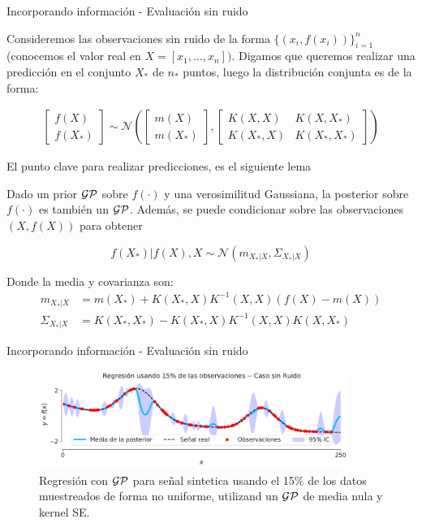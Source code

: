 \documentclass[handout, 9pt]{beamer}
\begin{document}
\begin{frame}{Incorporando información - Evaluación sin ruido}

Consideremos las observaciones sin ruido de la forma $\{(x_i, f(x_i))\}_{i=1}^{n}$ (conocemos el valor real en $X = [x_1 , \dots , x_n])$. Digamos que queremos realizar una predicción en el conjunto $X_*$ de $n_*$ puntos, luego la distribución conjunta es de la forma: \pause 

\begin{align*}
  \begin{bmatrix} f(X) \\ f(X_*)  \end{bmatrix}
  \sim \mathcal{N} \left(
  \begin{bmatrix} m(X) \\ m(X_*)  \end{bmatrix}, 
  \begin{bmatrix}
    K(X, X) & K(X, X_*) \\ K(X_*, X) & K(X_*, X_*)
  \end{bmatrix}
   \right)
\end{align*} \pause 

El punto clave para realizar predicciones, es el siguiente lema \pause 

\begin{lemma}
  Dado un prior $\mathcal{GP}$ sobre $f(\cdot)$ y una verosimilitud Gaussiana, la posterior sobre $f(\cdot)$ es también un $\mathcal{GP}$. Además, se puede condicionar sobre las observaciones $(X, f(X))$ para obtener

\begin{equation*}
  f(X_*)|f(X), X  \sim \mathcal{N}(m_{X_*|X}, \Sigma_{X_*|X}) \label{eq:gp_post}
\end{equation*}

Donde la media y covarianza son:
\begin{align*}
  m_{X_*|X} & = m(X_*) + K(X_*, X)K^{-1}(X, X) (f(X) - m(X))\\
   \Sigma_{X_*|X} & = K(X_*, X_*) - K(X_*, X)K^{-1}(X, X) K(X, X_*)
\end{align*}
\end{lemma}

\end{frame}

\begin{frame}{Incorporando información - Evaluación sin ruido}
\begin{figure}[H]
  \centering
  \includegraphics[width=0.9\textwidth]{../img/cap8_posterior_no_ruido}
  \caption{Regresión con $\mathcal{GP}$ para señal sintetica usando el 15$\%$ de los datos muestreados de forma no uniforme, utilizand un $\mathcal{GP}$ de media nula y kernel SE.} 
  \label{fig:gp_2}
\end{figure}


\end{frame}
\end{document}
